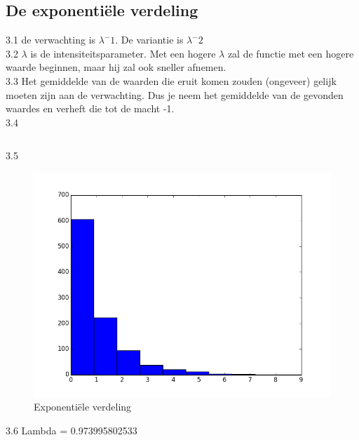 \documentclass[pdftex,12pt,a4paper]{article}
\begin{document}
    \subsection{De exponentiële verdeling}
        3.1 de verwachting is $\lambda^-1$. De variantie is $\lambda^-2$\\
        3.2 $\lambda$ is de intensiteitsparameter. Met een hogere $\lambda$ zal de functie 
        met een hogere waarde beginnen, maar hij zal ook sneller afnemen. \\
        3.3 Het gemiddelde van de waarden die eruit komen zouden (ongeveer) gelijk moeten zijn aan de verwachting.
        Dus je neem het gemiddelde van de gevonden waardes en verheft die tot de macht -1.\\
        3.4
		\inputminted{python}{lab-2_3.py}
		3.5
		\begin{figure}[H]
        	\centering
            \includegraphics[width=0.75\linewidth]{figure_2.png}
            \caption{Exponentiële verdeling}
            \label{fig:results}
        \end{figure}
        3.6 Lambda = 0.973995802533
		
\pagebreak
\end{document}
